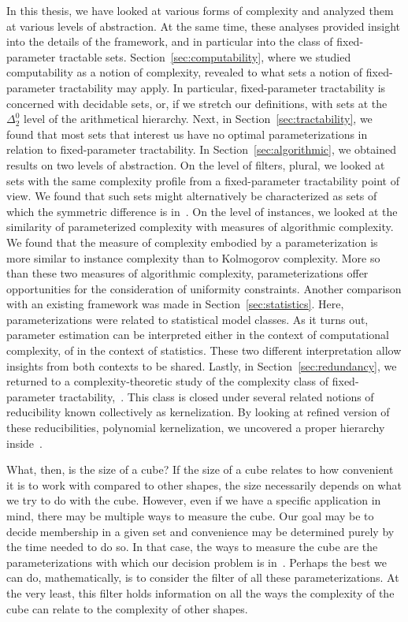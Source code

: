 In this thesis, we have looked at various forms of complexity and analyzed them at various levels of abstraction.
At the same time, these analyses provided insight into the details of the framework, and in particular into the class of fixed-parameter tractable sets.
Section~\ref{sec:computability}, where we studied computability as a notion of complexity, revealed to what sets a notion of fixed-parameter tractability may apply.
In particular, fixed-parameter tractability is concerned with decidable sets, or, if we stretch our definitions, with sets at the $\Delta^0_2$ level of the arithmetical hierarchy.
Next, in Section~\ref{sec:tractability}, we found that most sets that interest us have no optimal parameterizations in relation to fixed-parameter tractability.
In Section~\ref{sec:algorithmic}, we obtained results on two levels of abstraction.
On the level of filters, plural, we  looked at sets with the same complexity profile from a fixed-parameter tractability point of view.
We found that such sets might alternatively be characterized as sets of which the symmetric difference is in~.
On the level of instances, we looked at the similarity of parameterized complexity with measures of algorithmic complexity.
We found that the measure of complexity embodied by a parameterization is more similar to instance complexity than to Kolmogorov complexity.
More so than these two measures of algorithmic complexity, parameterizations offer opportunities for the consideration of uniformity constraints.
Another comparison with an existing framework was made in Section~\ref{sec:statistics}.
Here, parameterizations were related to statistical model classes.
As it turns out, parameter estimation can be interpreted either in the context of computational complexity, of in the context of statistics.
These two different interpretation allow insights from both contexts to be shared.
Lastly, in Section~\ref{sec:redundancy}, we returned to a complexity-theoretic study of the complexity class of fixed-parameter tractability,~.
This class is closed under several related notions of reducibility known collectively as kernelization.
By looking at refined version of these reducibilities, polynomial kernelization, we uncovered a proper hierarchy inside~.

\medbreak
What, then, is the size of a cube?
If the size of a cube relates to how convenient it is to work with compared to other shapes, the size necessarily depends on what we try to do with the cube.
However, even if we have a specific application in mind, there may be multiple ways to measure the cube.
Our goal may be to decide membership in a given set and convenience may be determined purely by the time needed to do so.
In that case, the ways to measure the cube are the parameterizations with which our decision problem is in~.
Perhaps the best we can do, mathematically, is to consider the filter of all these parameterizations.
At the very least, this filter holds information on all the ways the complexity of the cube can relate to the complexity of other shapes.


